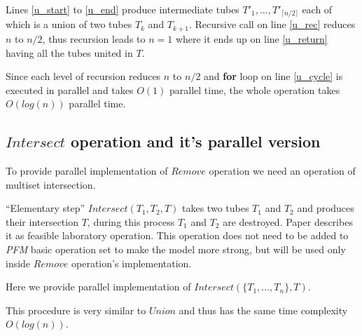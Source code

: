 
Lines \ref{u_start} to \ref{u_end} produce intermediate tubes $T'_1, \dots, T'_{\lceil n/2 \rceil}$ each of which is a union of two tubes $T_k$ and $T_{k+1}$. Recursive call on line \ref{u_rec} reduces $n$ to $n/2$, thus recursion leads to $n=1$ where it ends up on line \ref{u_return} having all the tubes united in $T$.

Since each level of recursion reduces $n$ to $n/2$ and {\bf for} loop on line \ref{u_cycle} is executed in parallel and takes $O(1)$ parallel time, the whole operation takes $O(log(n))$ parallel time.

\subsection{$Intersect$ operation and it's parallel version} \label{intersect}

To provide parallel implementation of $Remove$ operation we need an operation of multiset intersection. 

``Elementary step'' $Intersect(T_1, T_2, T)$ takes two tubes $T_1$ and $T_2$ and produces their intersection $T$, during this process $T_1$ and $T_2$ are destroyed. Paper \cite{Dantsin:2003} describes it as feasible laboratory operation. This operation does not need to be added to \emph{PFM} basic operation set to make the model more strong, but will be used only inside $Remove$ operation's implementation. 

Here we provide parallel implementation of $Intersect(\{T_1, ..., T_n\}, T)$.


This procedure is very similar to $Union$ and thus has the same time complexity $O(log(n))$.

